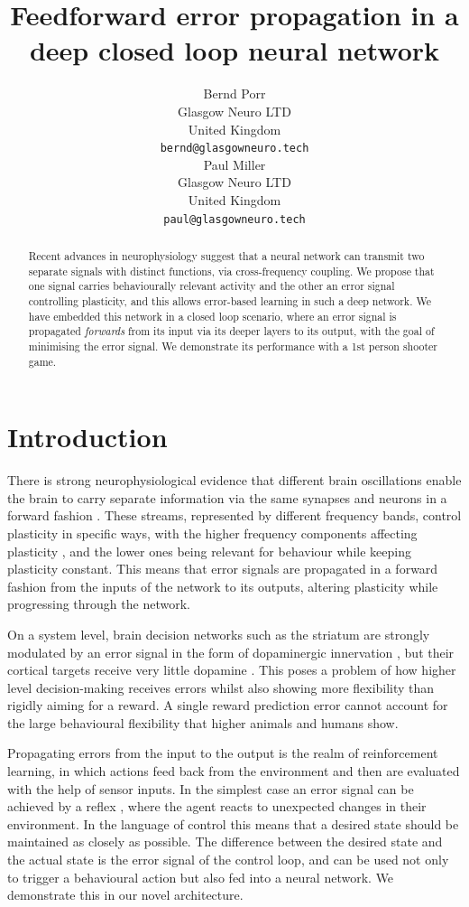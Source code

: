 \documentclass{article}
\title{Feedforward error propagation in a deep closed loop neural network}
\author{
  Bernd Porr\\
  Glasgow Neuro LTD\\
  United Kingdom\\
  \texttt{bernd@glasgowneuro.tech} \\
  Paul Miller \\
  Glasgow Neuro LTD \\
  United Kingdom \\
  \texttt{paul@glasgowneuro.tech}
}
\begin{document}
\maketitle

\begin{abstract}
  Recent advances in neurophysiology suggest that a neural network can
  transmit two separate signals with distinct functions, via
  cross-frequency coupling. We propose that one signal carries
  behaviourally relevant activity and the other an error signal
  controlling plasticity, and this allows error-based learning in such
  a deep network. We have embedded this network in a closed loop
  scenario, where an error signal is propagated \textsl{forwards} from
  its input via its deeper layers to its output, with the goal of
  minimising the error signal. We demonstrate its performance with a
  1st person shooter game.
\end{abstract}

\section{Introduction}
There is strong neurophysiological evidence that different brain
oscillations enable the brain to carry separate information via the
same synapses and neurons in a forward fashion
\cite{Canolty2010}. These streams, represented by different frequency
bands, control plasticity in specific ways, with the higher frequency
components affecting plasticity \cite{Bliss73}, and the lower ones
being relevant for behaviour \cite{Luescher2012} while keeping
plasticity constant. This means that error signals are propagated in a
forward fashion from the inputs of the network to its outputs,
altering plasticity while progressing through the network.

On a system level, brain decision networks such as the striatum
are strongly modulated by an error signal in the form of dopaminergic
innervation \cite{Schultz97}, but their cortical targets receive very
little dopamine \cite{Groenewegen1993}. This poses a problem of how
higher level decision-making receives errors whilst also showing more
flexibility than rigidly aiming for a reward. A single reward
prediction error cannot account for the large behavioural flexibility
that higher animals and humans show.

Propagating errors from the input to the output is the realm of
reinforcement learning, in which actions feed back from the
environment and then are evaluated with the help of sensor
inputs\cite{Verschure91,Dayan1992,Sutton88,Sutton98,Abbott01,Woergoetter2005}.
In the simplest case an error signal can be achieved by a reflex
\cite{Verschure91,PorrNecoInvco2003}, where the agent reacts to
unexpected changes in their environment. In the language of control
\cite{Phillips2000} this means that a desired state should be
maintained as closely as possible. The difference between the desired
state and the actual state is the error signal of the control loop,
and can be used not only to trigger a behavioural action but also fed
into a neural network. We demonstrate this in our novel architecture.
\end{document}
